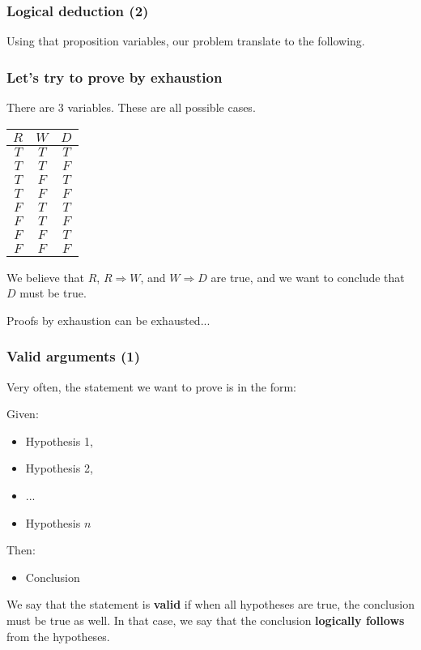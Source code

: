 \begin{frame}\frametitle{Logical deduction (2)}
  Using that proposition variables, our problem translate to the
  following.

  \vspace{2.5in}
  
\end{frame}

\begin{frame}\frametitle{Let's try to prove by exhaustion}
  \pause
  There are 3 variables.  These are all possible cases.

  \vspace{0.1in}

  \begin{tabular}{|c|c|c|}
    \hline
    $R$ & $W$ & $D$ \\
    \hline 
    $T$ & $T$ & $T$ \\
    $T$ & $T$ & $F$ \\
    $T$ & $F$ & $T$ \\
    $T$ & $F$ & $F$ \\
    $F$ & $T$ & $T$ \\
    $F$ & $T$ & $F$ \\
    $F$ & $F$ & $T$ \\
    $F$ & $F$ & $F$ \\
    \hline
  \end{tabular}

  \vspace{0.1in}

  We believe that $R$, $R\Rightarrow W$, and $W\Rightarrow D$ are
  true, and we want to conclude that $D$ must be true.

  \pause

  Proofs by exhaustion can be exhausted... 
\end{frame}

\begin{frame}\frametitle{Valid arguments (1)}
  Very often, the statement we want to prove is in the form:

  \begin{tcolorbox}
    Given:
    \begin{itemize}
    \item Hypothesis 1,
    \item Hypothesis 2,
    \item ...
    \item Hypothesis $n$
    \end{itemize}
    Then:
    \begin{itemize}
    \item Conclusion
    \end{itemize}
  \end{tcolorbox}

  \pause

  We say that the statement is {\bf valid} if when all hypotheses are
  true, the conclusion must be true as well.  In that case, we say
  that the conclusion {\bf logically follows} from the hypotheses.
\end{frame}

